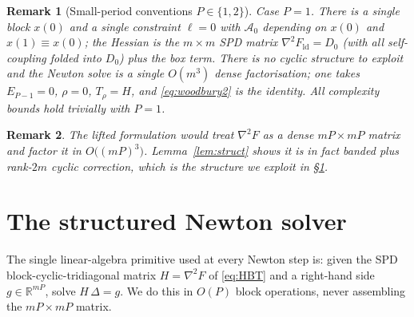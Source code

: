 \documentclass{amsart}
\newtheorem{remark}{Remark}
\newcommand{\R}{\mathbb{R}}
\begin{document}
\begin{remark}[Small-period conventions $P\in\{1,2\}$]
\emph{Case $P=1$.} There is a single block $x(0)$ and a single constraint $\ell=0$
with $\mathcal A_0$ depending on $x(0)$ and $x(1)\equiv x(0)$; the Hessian is the
$m\times m$ SPD matrix $\nabla^2F_{\mathrm{ld}}=D_0$ (with all self-coupling folded
into $D_0$) plus the box term. There is no cyclic structure to exploit and the Newton
solve is a single $O(m^3)$ dense factorisation; one takes $E_{P-1}=0$, $\rho=0$,
$T_\rho=H$, and \eqref{eq:woodbury2} is the identity. All complexity bounds hold
trivially with $P=1$.
\end{remark}

\begin{remark}
The lifted formulation would treat $\nabla^2F$ as a dense $mP\times mP$ matrix and
factor it in $O\!\big((mP)^3\big)$. Lemma~\ref{lem:struct} shows it is in fact
banded plus rank-$2m$ cyclic correction, which is the structure we exploit in
\S\ref{sec:linalg}.
\end{remark}

\section{The structured Newton solver}\label{sec:linalg}

The single linear-algebra primitive used at every Newton step is: given the SPD
block-cyclic-tridiagonal matrix $H=\nabla^2F$ of \eqref{eq:HBT} and a right-hand
side $g\in\R^{mP}$, solve $H\,\Delta=g$. We do this in $O(P)$ block operations,
never assembling the $mP\times mP$ matrix.
\end{document}

